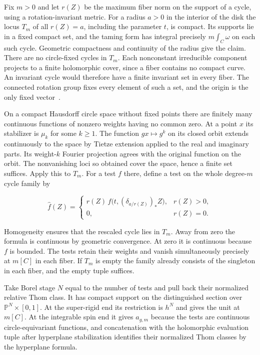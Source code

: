 Fix $m>0$ and let $r(Z)$ be the maximum fiber norm on the support
of a cycle, using a rotation-invariant metric. For a radius $a>0$
in the interior of the disk the locus $T_m$ of all $r(Z)=a$,
including the parameter $t$, is compact. Its supports lie in a
fixed compact set, and the taming form has integral precisely
$m\int_C\omega$ on each such cycle. Geometric compactness and
continuity of the radius give the claim. There are no circle-fixed
cycles in $T_m$. Each nonconstant irreducible component projects
to a finite holomorphic cover, since a fiber contains no compact
curve. An invariant cycle would therefore have a finite invariant
set in every fiber. The connected rotation group fixes every
element of such a set, and the origin is the only fixed vector~\cite[Theorem 2.11]{DIW}.

On a compact Hausdorff circle space without fixed points there
are finitely many continuous functions of nonzero weights having
no common zero. At a point $x$ its stabilizer is $\mu_k$ for some
$k\geq1$. The function $gx\mapsto g^k$ on its closed orbit
extends continuously to the space by Tietze extension applied to
the real and imaginary parts. Its weight-$k$ Fourier projection
agrees with the original function on the orbit. The nonvanishing
loci so obtained cover the space, hence a finite set suffices.
Apply this to $T_m$. For a test $f$ there, define a test on the
whole degree-$m$ cycle family by

\[
 \widehat f(Z)=
 \begin{cases}
 r(Z)\,f\bigl(t,(\delta_{a/r(Z)})_*Z\bigr),&r(Z)>0,\\
 0,&r(Z)=0 .
 \end{cases}
\]

Homogeneity ensures that the rescaled cycle lies in $T_m$.
Away from zero the formula is continuous by geometric convergence.
At zero it is continuous because $f$ is bounded. The tests retain
their weights and vanish simultaneously precisely at $m[C]$ in
each fiber. If $T_m$ is empty the family already consists of the
singleton in each fiber, and the empty tuple suffices.

Take Borel stage $N$ equal to the number of tests and pull back
their normalized relative Thom class. It has compact support on
the distinguished section over $\mathbb P^N\times[0,1]$. At the
super-rigid end its restriction is $h^N$ and gives the unit at
$m[C]$. At the integrable spin end it gives $a_{g,m}$ because the tests
are continuous circle-equivariant functions, and concatenation
with the holomorphic evaluation tuple after hyperplane stabilization
identifies their normalized Thom classes by the hyperplane formula.

